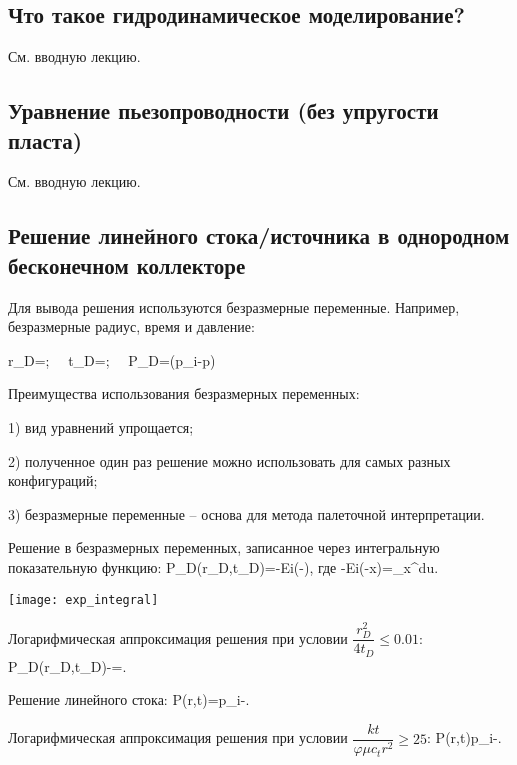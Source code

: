 \documentclass[main.tex]{subfiles}
\begin{document}
\subsection{Что такое гидродинамическое моделирование?}

См. вводную лекцию.

\subsection{Уравнение пьезопроводности (без упругости пласта)}

См. вводную лекцию.

\subsection{Решение линейного стока/источника в однородном бесконечном коллекторе}

Для вывода решения используются безразмерные переменные. Например, безразмерные радиус, время и давление:

\beq
r_D=;\,\,\,\,\,\,\,\,t_D=;\,\,\,\,\,\,\,\,P_D=\left(p_i-p\right)
\eeq

Преимущества использования безразмерных переменных:

1) вид уравнений упрощается;

2) полученное один раз решение можно использовать для самых разных конфигураций;

3) безразмерные переменные -- основа для метода палеточной интерпретации.

Решение в безразмерных переменных, записанное через интегральную показательную функцию:
\beq
P_D(r_D,t_D)=-Ei\left(-\right),
\eeq
где
\beq
-Ei(-x)=\int\limits_{x}^{\infty}du.
\eeq

\texttt{[image: exp\_integral]}

Логарифмическая аппроксимация решения при условии $\dfrac{r_D^2}{4t_D}\leqslant0.01$:
\beq
P_D(r_D,t_D)\approx -=.
\eeq

Решение линейного стока:
\beq
P(r,t)=p_i-.
\eeq

Логарифмическая аппроксимация решения при условии $\dfrac{kt}{\varphi \mu c_t r^2}\geqslant25$:
\beq
P(r,t)\approx p_i-.
\eeq
\end{document}
